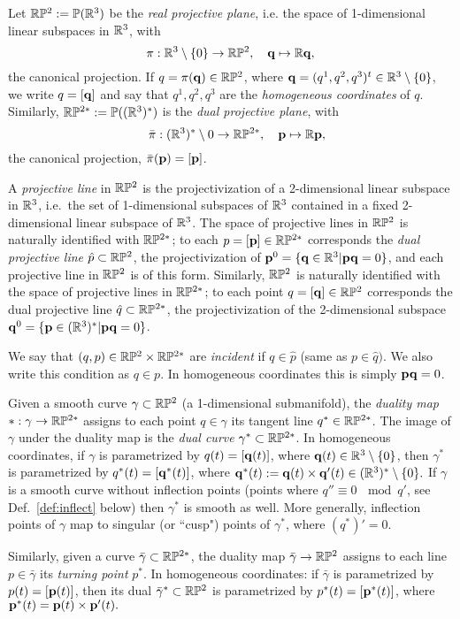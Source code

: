 Let $\mathbb{R}\mathbb{P}^2:=\mathbb{P}(\mathbb{R}^3)$ be the  {\em  real projective plane}, i.e. the space of 1-dimensional linear subspaces in $\mathbb{R}^3$,  with   $$\pi:\mathbb{R}^3\setminus\{ 0\}\to \mathbb{R}\mathbb{P}^2,\quad \mathbf q\mapsto \mathbb{R}\mathbf q,$$
the canonical projection. If $q=\pi(\mathbf q)\in\mathbb{R}\mathbb{P}^2$, where $\mathbf q=(q^1,q^2,q^3)^t\in\mathbb{R}^3\setminus\{0\}$, we write $q=[\mathbf q]$ and say that  $q^1,q^2,q^3$ are the {\em homogeneous coordinates} of $q$. 
Similarly, $\mathbb{R}\mathbb{P}^{2*}:=\mathbb{P}((\mathbb{R}^3)^*)$ is the {\em dual projective plane}, with $$ \quad \bar\pi:(\mathbb{R}^3)^*\setminus 0\to \mathbb{R}\mathbb{P}^{2*}, \quad {\mathbf p}\mapsto \mathbb{R}{\mathbf p},$$ the canonical projection,  $\bar\pi({\mathbf p})=[{\mathbf p}]$. 

 A {\em projective line} in $\mathbb{R}\mathbb{P}^2$ is the projectivization of a 2-dimensional linear subspace in $\mathbb{R}^3$, 
i.e.~the set of 1-dimensional subspaces of $\mathbb{R}^3$ contained in a fixed 2-dimensional linear 
subspace of $\mathbb{R}^3$. The space of  projective lines in $\mathbb{R}\mathbb{P}^2$ is 
naturally identified with $\mathbb{R}\mathbb{P}^{2*}$;
to each $p=[{\mathbf p}]\in\mathbb{R}\mathbb{P}^{2*}$ corresponds the {\em dual projective line}
 $\hat p\subset \mathbb{R}\mathbb{P}^2$, the projectivization of  
${\mathbf p}^0=\{\mathbf q\in\mathbb{R}^3|{\mathbf p}\mathbf q=0\}$, and each projective line in 
$\mathbb{R}\mathbb{P}^2$ is of this form. 
Similarly, $\mathbb{R}\mathbb{P}^2$ is 
naturally identified with the space of projective lines in $\mathbb{R}\mathbb{P}^{2*}$; to each 
point $q=[\mathbf q]\in\mathbb{R}\mathbb{P}^2$ corresponds the dual  projective line $\hat q\subset \mathbb{R}\mathbb{P}^{2*}$, 
the projectivization of the 2-dimensional subspace $\mathbf q^0=\{{\mathbf p}\in(\mathbb{R}^3)^*|{\mathbf p}\mathbf q=0\}$. 

We say that $(q,p)\in \mathbb{R}\mathbb{P}^2\times\mathbb{R}\mathbb{P}^{2*}$ 
are {\em incident} if $q\in\hat p$ (same as $p\in \hat q).$ We  also write this condition as $q\in p$. 
In homogeneous coordinates this is simply ${\mathbf p}\mathbf q=0$. 



 Given a smooth  curve $\gamma\subset \mathbb{R}\mathbb{P}^2$ (a 1-dimensional submanifold), the {\em duality map}  $*:\gamma\to \mathbb{R}\mathbb{P}^{2*}$ assigns to each point $q\in \gamma$ its tangent line $q^*\in\mathbb{R}\mathbb{P}^{2*}$. The image of $\gamma$ under the duality map is the {\em  dual curve}  $\gamma^*\subset \mathbb{R}\mathbb{P}^{2*}$. In homogeneous coordinates, if $\gamma$ is parametrized by $q(t)=[\mathbf q(t)]$, where  $\mathbf q(t)\in\mathbb{R}^3\setminus \{0\}$, then $\gamma^*$ is parametrized by $q^*(t)=[\mathbf q^*(t)]$, where $\mathbf q^*(t):=\mathbf q(t)\times \mathbf q'(t)\in(\mathbb{R}^3)^*\setminus \{0\}.$ If $\gamma$ is a smooth curve without inflection points (points where $q''\equiv 0 \, \mod q'$, see  Def.~\ref{def:inflect} below) then $\gamma^*$ is smooth as well. More generally,  inflection points of $\gamma$  map to singular (or ``cusp") points 
of $\gamma^*$, where $(q^*)'=0$. 

 Similarly, given a curve $\bar \gamma\subset \mathbb{R}\mathbb{P}^{2*}$, the duality map $\bar \gamma\to \mathbb{R}\mathbb{P}^2$
 assigns to each line $p\in\bar \gamma$  its {\em turning point} $p^*$.
 In homogeneous coordinates:  if $\bar \gamma$ is parametrized by $p(t)=[{\mathbf p}(t)]$, 
then its dual   $\bar \gamma^*\subset \mathbb{R}\mathbb{P}^2$ is parametrized by $p^*(t)=[{\mathbf p}^*(t)]$, 
where ${\mathbf p}^*(t)={\mathbf p}(t)\times{\mathbf p}'(t).$ 


